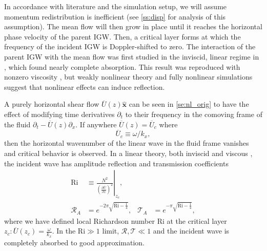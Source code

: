 \documentclass[
        fleqn,
        usenatbib,
    ]{mnras}
\newcommand*{\pd}[2]{\frac{\partial#1}{\partial#2}}
\newcommand*{\at}[1]{\left.#1\right|}
\newcommand*{\p}[1]{\left(#1\right)}
\newcommand*{\uv}[1]{\hat{\boldsymbol{\mathbf{#1}}}}
\begin{document}
In accordance with literature and the simulation setup, we will assume momentum
redistribution is inefficient (see \autoref{ss:disp} for analysis of this
assumption). The mean flow will then grow in place until it reaches the
horizontal phase velocity of the parent IGW\@. Then, a critical layer forms at
which the frequency of the incident IGW is Doppler-shifted to zero. The
interaction of the parent IGW with the mean flow was first studied in the
inviscid, linear regime in \citep{booker_bretherton}, which found nearly
complete absorption. This result was reproduced with nonzero viscosity
\citep{hazel}, but weakly nonlinear theory \citep{brown_stewartson} and fully
nonlinear simulations \citep{winters1994} suggest that nonlinear effects can
induce reflection.

A purely horizontal shear flow $\overline{U}(z) \uv{x}$ can be seen in
\autoref{se:nl_orig} to have the effect of modifying time derivatives
$\partial_t$ to their frequency in the comoving frame of the fluid $\partial_t -
\overline{U}(z)\partial_x$. If anywhere $\overline{U}(z) = \overline{U}_c$ where
\begin{equation}
    \overline{U}_c \equiv \omega / k_x,\label{eq:u_c}
\end{equation}
then the horizontal wavenumber of the linear wave in the fluid frame vanishes
and critical behavior is observed. In a linear theory, both inviscid
\citep{booker_bretherton} and viscous \citep{hazel}, the incident wave has
amplitude reflection and transmission coefficients
\begin{align}
    \mathrm{Ri} &\equiv \at{\frac{N^2}{\p{\pd{\overline{U}}{z}}^2}}_{z_c},
        \label{eq:ri_def}\\
    \mathcal{R}_A &= e^{-2\pi \sqrt{\mathrm{Ri} - \frac{1}{4}}}, &
    \mathcal{T}_A &= e^{-\pi \sqrt{\mathrm{Ri} - \frac{1}{4}}},
        \label{eq:crit_coeffs}
\end{align}
where we have defined local Richardson number Ri at the critical layer $z_c:
\overline{U}(z_c) = \frac{\omega}{k_{x}}$. In the $\mathrm{Ri} \gg 1$ limit,
$\mathcal{R}, \mathcal{T} \ll 1$ and the incident wave is completely absorbed to
good approximation.
\end{document}
